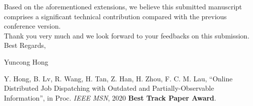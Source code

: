 \documentclass[10pt,draftclsnofoot,onecolumn]{article}
\begin{document}
\begin{enumerate}
\end{enumerate}

Based on the aforementioned extensions, we believe this submitted manuscript comprises a significant technical contribution compared with the previous conference version.\\

Thank you very much and we look forward to your feedbacks on this submission.\\

Best Regards,

Yuncong Hong
\vspace{+20mm}

\noindent [1] Y. Hong, B. Lv, R. Wang, H. Tan, Z. Han, H. Zhou, F. C. M. Lau, ``Online Distributed Job Dispatching with Outdated and Partially-Observable Information'', in Proc. \emph{IEEE MSN}, 2020 \textbf{Best Track Paper Award}.\\
\end{document}

